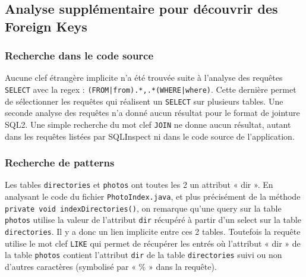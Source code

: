 \subsection{Analyse supplémentaire pour découvrir des Foreign Keys}
\subsubsection{Recherche dans le code source}
Aucune clef étrangère implicite n'a été trouvée suite à l'analyse des requêtes \texttt{SELECT} avec la regex : \texttt{(FROM|from).*,.*(WHERE|where)}. Cette dernière permet de sélectionner les requêtes qui réalisent un \texttt{SELECT} sur plusieurs tables.
Une seconde analyse des requêtes n'a donné aucun résultat pour le format de jointure SQL2. Une simple recherche du mot clef \texttt{JOIN} ne donne aucun résultat, autant dans les requêtes listées par SQLInspect ni dans le code source de l'application.

\subsubsection{Recherche de patterns}
Les tables \texttt{directories} et \texttt{photos} ont toutes les 2 un attribut « dir ». En analysant le code du fichier \texttt{PhotoIndex.java}, et plus précisément de la méthode\\\texttt{private void indexDirectories()}, on remarque qu'une query sur la table \texttt{photos} utilise la valeur de l'attribut \texttt{dir} récupéré à partir d'un select sur la table \texttt{directories}. Il y a donc un lien implicite entre ces 2 tables. Toutefois la requête utilise le mot clef \texttt{LIKE} qui permet de récupérer les entrés où l'attribut « dir » de la table \texttt{photos} contient l'attribut \texttt{dir} de la table \texttt{directories} suivi ou non d'autres caractères (symbolisé par « \% » dans la requête).


